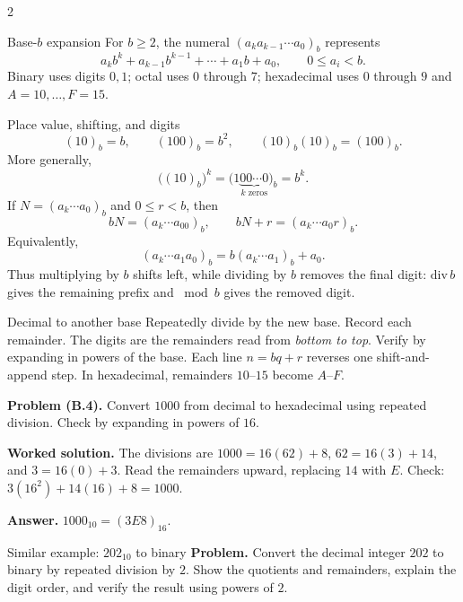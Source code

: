\documentclass[10pt]{article}
\begin{document}
\begingroup
{}
\begin{multicols}{2}\small
\begin{definitionbox}{Base-$b$ expansion}
For $b\ge2$, the numeral $(a_ka_{k-1}\cdots a_0)_b$ represents
\[
 a_kb^k+a_{k-1}b^{k-1}+\cdots+a_1b+a_0,
 \qquad 0\le a_i<b.
\]
Binary uses digits $0,1$; octal uses $0$ through $7$; hexadecimal uses
$0$ through $9$ and $A=10,\ldots,F=15$.
\end{definitionbox}

\begin{methodbox}{Place value, shifting, and digits}
\[
(10)_b=b,\qquad (100)_b=b^2,\qquad
(10)_b(10)_b=(100)_b.
\]
More generally,
\[
\bigl((10)_b\bigr)^k
=\bigl(1\underbrace{00\cdots0}_{k\text{ zeros}}\bigr)_b=b^k.
\]
If $N=(a_k\cdots a_0)_b$ and $0\le r<b$, then
\[
bN=(a_k\cdots a_00)_b,
\qquad bN+r=(a_k\cdots a_0r)_b.
\]
Equivalently,
\[
(a_k\cdots a_1a_0)_b=b(a_k\cdots a_1)_b+a_0.
\]
Thus multiplying by $b$ shifts left, while dividing by $b$ removes the final
digit: $\mathrm{div}\,b$ gives the remaining prefix and $\bmod b$ gives the
removed digit.
\end{methodbox}

\begin{methodbox}{Decimal to another base}
Repeatedly divide by the new base. Record each remainder. The digits are the
remainders read from \emph{bottom to top}. Verify by expanding in powers of the
base. Each line $n=bq+r$ reverses one shift-and-append step. In hexadecimal,
remainders $10$--$15$ become $A$--$F$.

\textbf{Problem (B.4).} Convert $1000$ from decimal to hexadecimal using repeated division. Check by expanding in powers of $16$.

\textbf{Worked solution.} The divisions are $1000=16(62)+8$, $62=16(3)+14$, and $3=16(0)+3$. Read the remainders upward, replacing $14$ with $E$. Check: $3(16^2)+14(16)+8=1000$.

\textbf{Answer.} $1000_{10}=(3E8)_{16}$.
\end{methodbox}

\begin{workedbox}{Similar example: $202_{10}$ to binary}
\textbf{Problem.} Convert the decimal integer $202$ to binary by repeated division by $2$. Show the quotients and remainders, explain the digit order, and verify the result using powers of $2$.


\end{workedbox}
\end{multicols}
\end{document}
